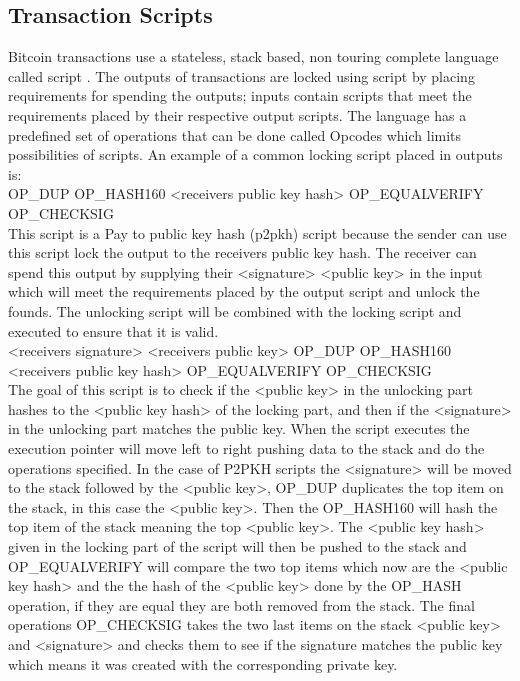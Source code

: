 \subsection{Transaction Scripts}
\label{subsec:scripts}

Bitcoin transactions use a stateless, stack based, non touring complete language called script \cite{antonopoulos2017mastering}.
The outputs of transactions are locked using script by placing requirements for spending the outputs; inputs contain scripts that meet the requirements placed by their respective output scripts. The language has a predefined set of operations that can be done called Opcodes which limits possibilities of scripts. 
An example of a common locking script placed in outputs is: 
\\

OP\_DUP OP\_HASH160 <receivers public key hash> OP\_EQUALVERIFY OP\_CHECKSIG
\\

This script is a Pay to public key hash (p2pkh) script because the sender can use this script lock the output to the receivers public key hash. The receiver can spend this output by supplying their <signature> <public key> in the input which will meet the requirements placed by the output script and unlock the founds. The unlocking script will be combined with the locking script and executed to ensure that it is valid. 
\\

<receivers signature> <receivers public key> OP\_DUP OP\_HASH160 <receivers public key hash> OP\_EQUALVERIFY OP\_CHECKSIG
\\

The goal of this script is to check if the <public key> in the unlocking part hashes to the <public key hash> of the locking part, and then if the <signature> in the unlocking part matches the public key.
When the script executes the execution pointer will move left to right pushing data to the stack and do the operations specified.
In the case of P2PKH scripts the <signature> will be moved to the stack followed by the <public key>, OP\_DUP duplicates the top item on the stack, in this case the <public key>. Then the OP\_HASH160 will hash the top item of the stack meaning the top <public key>. The <public key hash> given in the locking part of the script will then be pushed to the stack and OP\_EQUALVERIFY will compare the two top items which now are the <public key hash> and the the hash of the <public key> done by the OP\_HASH operation, if they are equal they are both removed from the stack. The final operations OP\_CHECKSIG takes the two last items on the stack <public key> and <signature> and checks them to see if the signature matches the public key which means it was created with the corresponding private key.
\\

